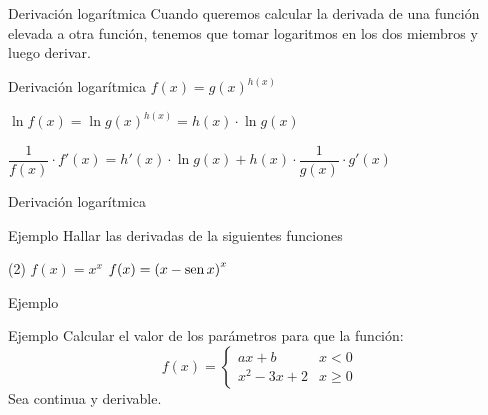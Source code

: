 \documentclass[8pt]{beamer}
\newcommand{\sen}{\mathop{\rm sen}\nolimits}
\begin{document}
\begin{frame}[t]{Derivación logarítmica}
Cuando queremos calcular la derivada de una función elevada a otra función, tenemos que tomar logaritmos en los dos miembros y luego derivar.

\begin{alertblock}{Derivación logarítmica}
$f(x)=g(x)^{h(x)}$

$\ln f(x)= \ln g(x)^{h(x)} = h(x) \cdot \ln g(x)$

$\dfrac{1}{f(x)}\cdot f'(x)= h'(x) \cdot \ln g(x)+ h(x) \cdot \dfrac{1}{g(x)}\cdot g'(x)$
\end{alertblock}
\end{frame}

\begin{frame}[t]{Derivación logarítmica}
\begin{exampleblock}{Ejemplo}
Hallar las derivadas de la siguientes funciones
\begin{tasks}[label=\alph*)](2)
\task $ f(x)= x^x$
\task $f(x)=\left( x-\sen x \right)^{x}$
\end{tasks}
\end{exampleblock}
\end{frame}

\begin{frame}[t]{Ejemplo}
\begin{exampleblock}{Ejemplo}
Calcular el valor de los parámetros para que la función:
\[f(x)=\left\{\begin{array}{cc} {ax+b} & {x<0} \\ {x^{2} -3x+2} & {x\geq 0} \end{array}\right. \] 
Sea continua y derivable.
\end{exampleblock}

\end{frame}
\end{document}
